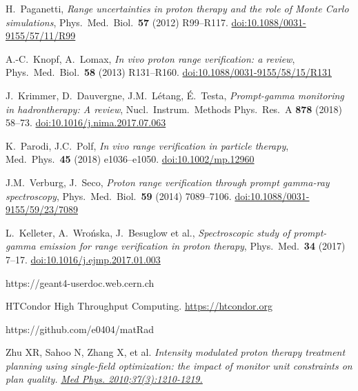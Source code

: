 \documentclass[a4paper]{article}
\begin{document}
\begin{thebibliography}{}

H.~Paganetti,
\emph{Range uncertainties in proton therapy and the role of Monte Carlo simulations},
Phys.\ Med.\ Biol.\ \textbf{57} (2012) R99--R117.
\href{https://doi.org/10.1088/0031-9155/57/11/R99}{doi:10.1088/0031-9155/57/11/R99}

A.-C.~Knopf, A.~Lomax,
\emph{In vivo proton range verification: a review},
Phys.\ Med.\ Biol.\ \textbf{58} (2013) R131--R160.
\href{https://doi.org/10.1088/0031-9155/58/15/R131}{doi:10.1088/0031-9155/58/15/R131}

J.~Krimmer, D.~Dauvergne, J.M.~L\'etang, \'E.~Testa,
\emph{Prompt-gamma monitoring in hadrontherapy: A review},
Nucl.\ Instrum.\ Methods Phys.\ Res.\ A \textbf{878} (2018) 58--73.
\href{https://doi.org/10.1016/j.nima.2017.07.063}{doi:10.1016/j.nima.2017.07.063}

K.~Parodi, J.C.~Polf,
\emph{In vivo range verification in particle therapy},
Med.\ Phys.\ \textbf{45} (2018) e1036--e1050.
\href{https://doi.org/10.1002/mp.12960}{doi:10.1002/mp.12960}

J.M.~Verburg, J.~Seco,
\emph{Proton range verification through prompt gamma-ray spectroscopy},
Phys.\ Med.\ Biol.\ \textbf{59} (2014) 7089--7106.
\href{https://doi.org/10.1088/0031-9155/59/23/7089}{doi:10.1088/0031-9155/59/23/7089}

L.~Kelleter, A.~Wrońska, J.~Besuglow et al.,
\emph{Spectroscopic study of prompt-gamma emission for range verification in proton therapy},
Phys.\ Med.\ \textbf{34} (2017) 7--17.
\href{https://doi.org/10.1016/j.ejmp.2017.01.003}{doi:10.1016/j.ejmp.2017.01.003}

https://geant4-userdoc.web.cern.ch

HTCondor High Throughput Computing.
\href{https://htcondor.org}{https://htcondor.org}

https://github.com/e0404/matRad

Zhu XR, Sahoo N, Zhang X, et al.
\emph{Intensity modulated proton therapy treatment planning using single-field optimization: the impact of monitor unit constraints on plan quality.}
\href{https://mdanderson.elsevierpure.com/en/publications/intensity-modulated-proton-therapy-treatment-planning-using-singl}{\emph{Med Phys. 2010;37(3):1210-1219.}}


\end{thebibliography}
\end{document}
